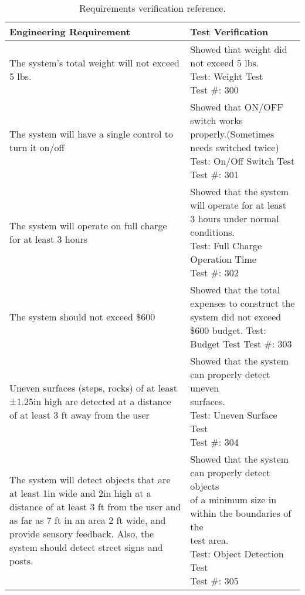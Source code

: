 \begin{table}[h]
\caption{Requirements verification reference.}
\label{table:caseStudyRequirementsVerification}
\begin{tabular}{|m{5cm}|m{8cm}|} \hline

\textbf{Engineering Requirement} & \textbf{Test Verification} \\ \hline


The system's total weight will not exceed 5 lbs. & 
\makecell[l]{
Showed that weight did not exceed 5 lbs. \\
Test: Weight Test\\
Test \#: 300} \\ \hline

The system will have a single control to turn it on/off & 
\makecell[l]{Showed that ON/OFF switch works \\
properly.(Sometimes needs switched twice) \\
Test: On/Off Switch Test\\
Test \#: 301} \\ \hline

The system will operate on full charge for at least 3 hours & 
\makecell[l]{Showed that the system will operate for at least \\
3 hours under normal conditions. \\
Test: Full Charge Operation Time\\
Test \#: 302} \\  \hline

The system should not exceed \$600 & 
\makecell[l]{Showed that the total expenses to construct the \\
system did not exceed \$600 budget. \\
Test: Budget Test\\
Test \#: 303} \\  \hline

Uneven surfaces (steps, rocks) of at least ±1.25in high are detected at
a distance of at least 3 ft away from the user & 
\makecell[l]{
Showed that the system can properly detect uneven \\
surfaces.\\
Test: Uneven Surface Test\\
Test \#: 304} \\ \hline

The system will detect objects that are at least 1in wide and 2in high
at a distance of at least 3 ft from the user and as far as 7 ft in an
area 2 ft wide, and provide sensory feedback. Also, the system should
detect street signs and posts. & 
\makecell[l]{
Showed that the system can properly detect objects \\
of a minimum size in within the boundaries of the \\
test area.\\
Test: Object Detection Test\\
Test \#: 305} \\ \hline


\end{tabular}
\end{table}
